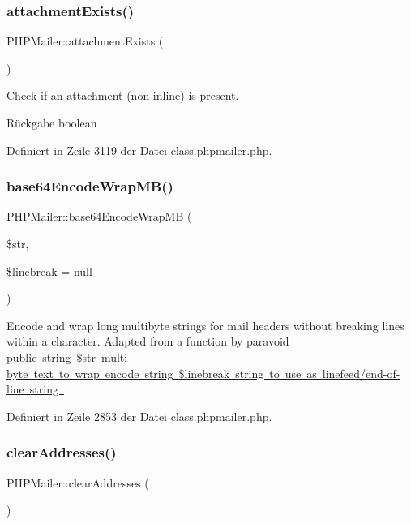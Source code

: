 \subsubsection{\texorpdfstring{attachment\+Exists()}{attachmentExists()}}
{\footnotesize\ttfamily P\+H\+P\+Mailer\+::attachment\+Exists (\begin{DoxyParamCaption}{ }\end{DoxyParamCaption})}

Check if an attachment (non-\/inline) is present. \begin{DoxyReturn}{Rückgabe}
boolean 
\end{DoxyReturn}


Definiert in Zeile 3119 der Datei class.\+phpmailer.\+php.

\mbox{\label{class_p_h_p_mailer_a6ca640040a05915b0f9e27a39eb4bba9}} 
\subsubsection{\texorpdfstring{base64\+Encode\+Wrap\+M\+B()}{base64EncodeWrapMB()}}
{\footnotesize\ttfamily P\+H\+P\+Mailer\+::base64\+Encode\+Wrap\+MB (\begin{DoxyParamCaption}\item[{}]{\$str,  }\item[{}]{\$linebreak = {\ttfamily null} }\end{DoxyParamCaption})}

Encode and wrap long multibyte strings for mail headers without breaking lines within a character. Adapted from a function by paravoid \mbox{\hyperlink{}{public  string \$str multi-\/byte text to wrap encode  string \$linebreak string to use as linefeed/end-\/of-\/line  string }}

Definiert in Zeile 2853 der Datei class.\+phpmailer.\+php.

\mbox{\label{class_p_h_p_mailer_aee6adb214d282869949246c5df46cdb5}} 
\subsubsection{\texorpdfstring{clear\+Addresses()}{clearAddresses()}}
{\footnotesize\ttfamily P\+H\+P\+Mailer\+::clear\+Addresses (\begin{DoxyParamCaption}{ }\end{DoxyParamCaption})}

